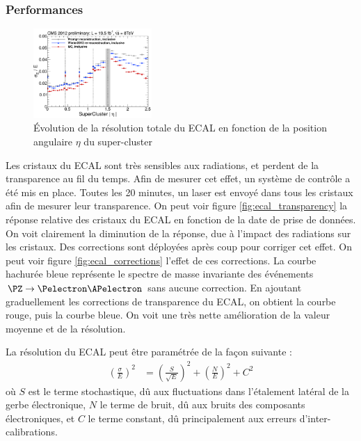 \subsubsection{Performances}

\begin{figure}[tbp] \centering
  \includegraphics[width=0.4\textwidth]{chapitre2/figs/ecal_resolution.pdf}
  \caption{Évolution de la résolution totale du ECAL en fonction de la position angulaire $\eta$ du super-cluster}
  \label{fig:ecal_resolution}
\end{figure}

Les cristaux du ECAL sont très sensibles aux radiations, et perdent de la transparence au fil du temps. Afin de mesurer cet effet, un système de contrôle a été mis en place. Toutes les 20 minutes, un laser est envoyé dans tous les cristaux afin de mesurer leur transparence. On peut voir figure \ref{fig:ecal_transparency} la réponse relative des cristaux du ECAL en fonction de la date de prise de données. On voit clairement la diminution de la réponse, due à l'impact des radiations sur les cristaux. Des corrections sont déployées après coup pour corriger cet effet. On peut voir figure \ref{fig:ecal_corrections} l'effet de ces corrections. La courbe hachurée bleue représente le spectre de masse invariante des événements $\PZ \rightarrow \Pelectron \APelectron$ sans aucune correction. En ajoutant graduellement les corrections de transparence du ECAL, on obtient la courbe rouge, puis la courbe bleue. On voit une très nette amélioration de la valeur moyenne et de la résolution.

\bigskip

La résolution du ECAL peut être paramétrée de la façon suivante :
\begin{align*}
  \left( \frac{\sigma}{E} \right)^2 &= \left( \frac{S}{\sqrt{E}} \right)^2 + \left( \frac{N}{E} \right)^2 + C^2
\end{align*}
où $S$ est le terme stochastique, dû aux fluctuations dans l'étalement latéral de la gerbe électronique, $N$ le terme de bruit, dû aux bruits des composants électroniques, et $C$ le terme constant, dû principalement aux erreurs d'inter-calibrations.

